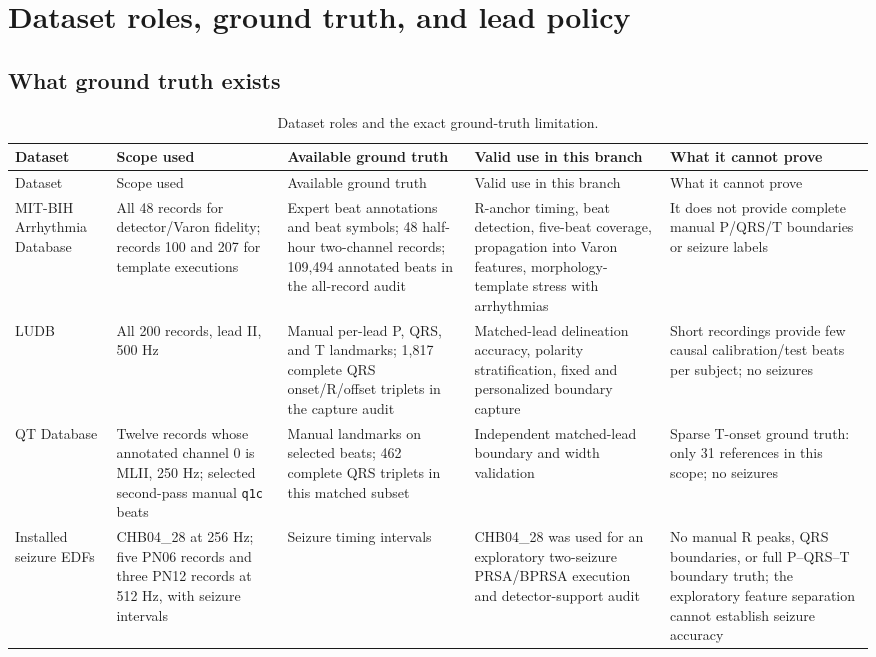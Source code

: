 \documentclass[11pt,a4paper]{article}
\begin{document}
\section{Dataset roles, ground truth, and lead policy}
\label{sec:datasets}

\subsection{What ground truth exists}

\begingroup
\setlength{\tabcolsep}{3pt}
\begin{longtable}{p{}p{}p{}p{}p{}}
\caption{Dataset roles and the exact ground-truth limitation.}\\
\toprule
Dataset & Scope used & Available ground truth & Valid use in this branch & What it cannot prove \\
\midrule
\endfirsthead
\toprule
Dataset & Scope used & Available ground truth & Valid use in this branch & What it cannot prove \\
\midrule
\endhead
MIT-BIH Arrhythmia Database & All 48 records for detector/Varon fidelity; records 100 and 207 for template executions & Expert beat annotations and beat symbols; 48 half-hour two-channel records; 109,494 annotated beats in the all-record audit & R-anchor timing, beat detection, five-beat coverage, propagation into Varon features, morphology-template stress with arrhythmias & It does not provide complete manual P/QRS/T boundaries or seizure labels \\
LUDB & All 200 records, lead II, 500 Hz & Manual per-lead P, QRS, and T landmarks; 1,817 complete QRS onset/R/offset triplets in the capture audit & Matched-lead delineation accuracy, polarity stratification, fixed and personalized boundary capture & Short recordings provide few causal calibration/test beats per subject; no seizures \\
QT Database & Twelve records whose annotated channel 0 is MLII, 250 Hz; selected second-pass manual \texttt{q1c} beats & Manual landmarks on selected beats; 462 complete QRS triplets in this matched subset & Independent matched-lead boundary and width validation & Sparse T-onset ground truth: only 31 references in this scope; no seizures \\
Installed seizure EDFs & CHB04\_28 at 256 Hz; five PN06 records and three PN12 records at 512 Hz, with seizure intervals & Seizure timing intervals & CHB04\_28 was used for an exploratory two-seizure PRSA/BPRSA execution and detector-support audit & No manual R peaks, QRS boundaries, or full P--QRS--T boundary truth; the exploratory feature separation cannot establish seizure accuracy \\
\bottomrule
\end{longtable}
\endgroup
\end{document}
